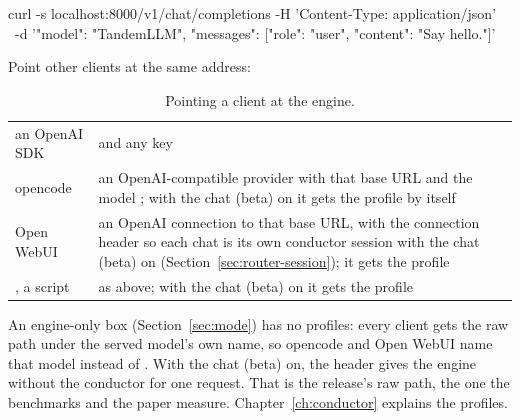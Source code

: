 \begin{shell}
curl -s localhost:8000/v1/chat/completions -H 'Content-Type: application/json' \
    -d '{"model": "TandemLLM", "messages": [{"role": "user", "content": "Say hello."}]}'
\end{shell}

Point other clients at the same address:

\begin{table}[htbp]
\centering\small
\caption{Pointing a client at the engine.}\label{tab:clients}
\begin{tabularx}{\linewidth}{@{}L{.2\linewidth}Y@{}}
\toprule
{} &  \\
\midrule
an OpenAI SDK &  and any key \\
opencode & an OpenAI-compatible provider with that base URL and the model ; with the chat (beta) on it gets the  profile by itself \\
Open WebUI & an OpenAI connection to that base URL, with the connection header \code{X-OpenWebUI-Chat-Id: {{CHAT_ID}}} so each chat is its own conductor session with the chat (beta) on (Section~\ref{sec:router-session}); it gets the  profile \\
\code{curl}, a script & as above; with the chat (beta) on it gets the \code{general} profile \\
\bottomrule
\end{tabularx}
\end{table}

An engine-only box (Section~\ref{sec:mode}) has no profiles: every client gets the raw path under the served model's own name, so opencode and Open WebUI name that model instead of . With the chat (beta) on, the header  gives the engine without the conductor for one request. That is the release's raw path, the one the benchmarks and the paper measure. Chapter~\ref{ch:conductor} explains the profiles.



